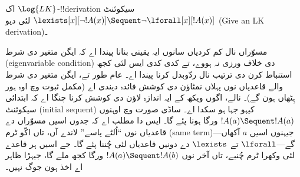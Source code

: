 \documentclass[../../../include/open-logic-section]{subfiles}
\begin{document}


\begin{ex}
اک $\Log{LK}$-!!{derivation} سیکوئنٹ $\lexists[x][\lnot !A(x)]
\Sequent \lnot \lforall[x][!A(x)]$ لئی دیو (Give an LK derivation)۔

مسوّراں نال کم کردیاں سانوں ایہ یقینی بنانا پیندا اے کہ ایگن متغیر دی شرط
(eigenvariable condition) دی خلاف ورزی نہ ہووے، تے کدی کدی ایس لئی کجھ استنباط
کرن دی ترتیب نال ردّوبدل کرنا پیندا اے۔ عام طور تے، ایگن متغیر دی شرط والے
قاعدیاں نوں پہلاں نمٹاؤن دی کوشش فائدہ دیندی اے (مکمل ثبوت وچ اوہ ہور ہِٹھاں
ہون گے)۔ نالے، اگوں ویکھ کے ایہ اندازہ لاؤن دی کوشش کرنا چنگا اے کہ ابتدائی
سیکوئنٹ (initial sequent) کیہو جہا ہو سکدا اے۔ ساڈی صورت وچ اوہنوں $!A(a)
\Sequent !A(a)$ ورگا ہونا پئے گا۔ ایس دا مطلب اے کہ جدوں اسیں مسوّراں دے
قاعدیاں نوں ``اُلٹے پاسے'' لاندے آں، تاں اکّو ٹرم (same term)—جیہنوں اسیں
$a$ آکھاں گے—$\lforall$ تے $\lexists$ دے دونیں قاعدیاں لئی چُننا پئے گا۔ جے
اسیں ہر قاعدے لئی وکھرا ٹرم چُنیے، تاں آخر نوں $!A(a) \Sequent !A(b)$ ورگا
کجھ ملے گا، جیہڑا ظاہر اے اخذ ہون جوگ نہیں۔


\end{ex}
\end{document}
